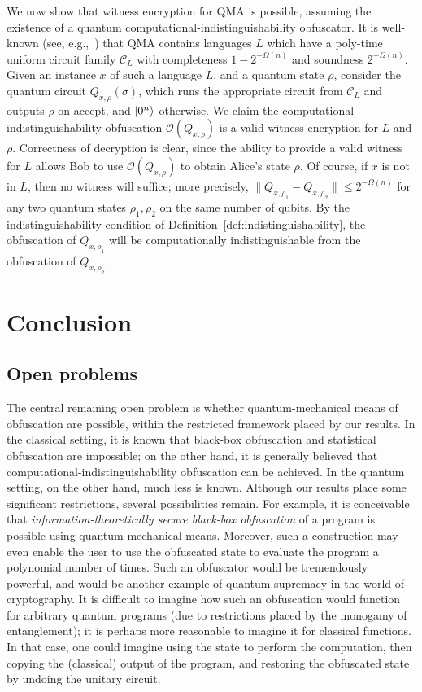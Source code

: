 \documentclass[envcountsame]{llncs}
\numberwithin{equation}{section}
\newcommand{\expref}[2]{\texorpdfstring{\hyperref[#2]{#1~\ref{#2}}}{#1~\ref{#2}}}
\newcommand{\algo}{\mathcal}
\begin{document}
We now show that witness encryption for QMA is possible, assuming the existence of a quantum computational-indistinguishability obfuscator. It is well-known (see, e.g.,~\cite{GN13}) that QMA contains languages $L$ which have a poly-time uniform circuit family $\mathcal C_L$ with completeness $1-2^{-\Omega(n)}$ and soundness $2^{-\Omega(n)}$. Given an instance $x$ of such a language $L$, and a quantum state $\rho$, consider the quantum circuit $Q_{x,\rho}(\sigma)$, which runs the appropriate circuit from $\mathcal C_L$ and outputs $\rho$ on accept, and ${\left\vert{0^n}\right\rangle}$ otherwise.  We claim the computational-indistinguishability obfuscation $\algo{O}(Q_{x,\rho})$ is a valid witness encryption for $L$ and $\rho$.  Correctness of decryption is clear, since the ability to provide a valid witness for $L$ allows Bob to use $\algo{O}(Q_{x,\rho})$ to obtain Alice's state $\rho$.  Of course, if $x$ is not in $L$, then no witness will suffice; more precisely, $\|Q_{x,\rho_1} - Q_{x, \rho_2}\| \leq 2^{-\Omega(n)}$ for any two quantum states $\rho_1, \rho_2$ on the same number of qubits. By the indistinguishability condition of \expref{Definition}{def:indistinguishability}, the obfuscation of $Q_{x,\rho_1}$ will be computationally indistinguishable from the obfuscation of $Q_{x,\rho_2}$.


\section{Conclusion}

\subsection{Open problems}

The central remaining open problem is whether quantum-mechanical means of obfuscation are possible, within the restricted framework placed by our results. In the classical setting, it is known that black-box obfuscation and statistical obfuscation are impossible; on the other hand, it is generally believed that computational-indistinguishability obfuscation can be achieved. In the quantum setting, on the other hand, much less is known. Although our results place some significant restrictions, several possibilities remain. For example, it is conceivable that \emph{information-theoretically secure black-box obfuscation} of a program is possible using quantum-mechanical means. Moreover, such a construction may even enable the user to use the obfuscated state to evaluate the program a polynomial number of times. Such an obfuscator would be tremendously powerful, and would be another example of quantum supremacy in the world of cryptography. It is difficult to imagine how such an obfuscation would function for arbitrary quantum programs (due to restrictions placed by the monogamy of entanglement); it is perhaps more reasonable to imagine it for classical functions. In that case, one could imagine using the state to perform the computation, then copying the (classical) output of the program, and restoring the obfuscated state by undoing the unitary circuit.
\end{document}
